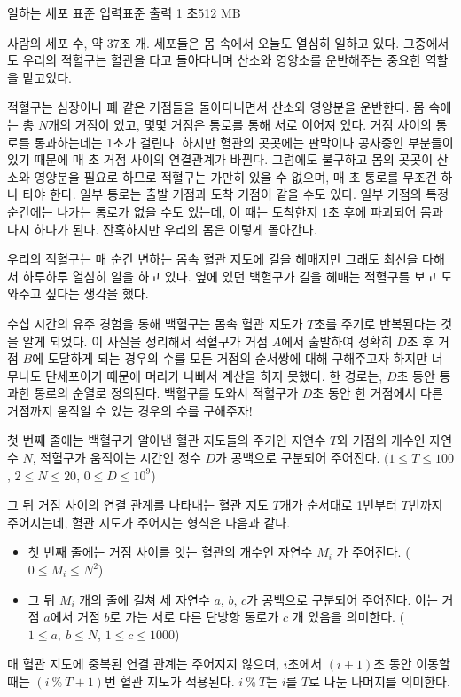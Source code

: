 \begin{problem}{일하는 세포}
    {표준 입력}{표준 출력}
    {1 초}{512 MB}{}
    
    사람의 세포 수, 약 37조 개. 세포들은 몸 속에서 오늘도 열심히 일하고 있다. 그중에서도 우리의 적혈구는 혈관을 타고 돌아다니며 산소와 영양소를 운반해주는 중요한 역할을 맡고있다.
    
    적혈구는 심장이나 폐 같은 거점들을 돌아다니면서 산소와 영양분을 운반한다. 몸 속에는 총 $ N $개의 거점이 있고, 몇몇 거점은 통로를 통해 서로 이어져 있다. 거점 사이의 통로를 통과하는데는 1초가 걸린다. 하지만 혈관의 곳곳에는 판막이나 공사중인 부분들이 있기 때문에 매 초 거점 사이의 연결관계가 바뀐다. 그럼에도 불구하고 몸의 곳곳이 산소와 영양분을 필요로 하므로 적혈구는 가만히 있을 수 없으며, 매 초 통로를 무조건 하나 타야 한다. 일부 통로는 출발 거점과 도착 거점이 같을 수도 있다. 일부 거점의 특정 순간에는 나가는 통로가 없을 수도 있는데, 이 때는 도착한지 1초 후에 파괴되어 몸과 다시 하나가 된다. 잔혹하지만 우리의 몸은 이렇게 돌아간다.
    
    우리의 적혈구는 매 순간 변하는 몸속 혈관 지도에 길을 헤매지만 그래도 최선을 다해서 하루하루 열심히 일을 하고 있다. 옆에 있던 백혈구가 길을 헤매는 적혈구를 보고 도와주고 싶다는 생각을 했다.
    
    수십 시간의 유주 경험을 통해 백혈구는 몸속 혈관 지도가 $ T $초를 주기로 반복된다는 것을 알게 되었다. 이 사실을 정리해서 적혈구가 거점 $ A $에서 출발하여 정확히 $ D $초 후 거점 $ B $에 도달하게 되는 경우의 수를 모든 거점의 순서쌍에 대해 구해주고자 하지만 너무나도 단세포이기 때문에 머리가 나빠서 계산을 하지 못했다. 한 경로는, $ D $초 동안 통과한 통로의 순열로 정의된다. 백혈구를 도와서 적혈구가 $ D $초 동안 한 거점에서 다른 거점까지 움직일 수 있는 경우의 수를 구해주자!
    
    \InputFile
    
    첫 번째 줄에는 백혈구가 알아낸 혈관 지도들의 주기인 자연수 $ T $와 거점의 개수인 자연수 $ N $, 적혈구가 움직이는 시간인 정수 $ D $가 공백으로 구분되어 주어진다. ($ 1 \leq T \leq 100 $, $ 2 \leq N \leq 20 $, $ 0 \leq D \leq 10^9 $)
    
    그 뒤 거점 사이의 연결 관계를 나타내는 혈관 지도 $ T $개가 순서대로 1번부터 $ T $번까지 주어지는데, 혈관 지도가 주어지는 형식은 다음과 같다.
    
    \begin{itemize}
        \item 첫 번째 줄에는 거점 사이를 잇는 혈관의 개수인 자연수 $ M_i $ 가 주어진다. ($ 0 \leq M_i \leq N^2 $)
        \item 그 뒤 $ M_i $ 개의 줄에 걸쳐 세 자연수 $ a $, $ b $, $ c $가 공백으로 구분되어 주어진다. 이는 거점 $ a $에서 거점 $ b $로 가는 서로 다른 단방향 통로가 $ c $ 개 있음을 의미한다. ($ 1 \leq a,\ b \leq N $, $ 1 \leq c \leq 1000 $)
    \end{itemize}
    매 혈관 지도에 중복된 연결 관계는 주어지지 않으며, $ i $초에서 $ (i+1) $초 동안 이동할 때는 $ (i\ \%\ T + 1) $번 혈관 지도가 적용된다. $ i\ \%\ T $는 $ i $를 $ T $로 나눈 나머지를 의미한다.
    

\end{problem}
